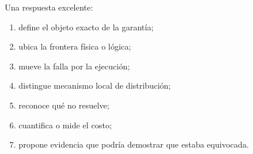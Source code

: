 \documentclass[variant=guiaresuelta,cover=institutional,mode=screen]{ua-engineering-v6-article}
\begin{document}
Una respuesta excelente:

\begin{enumerate}
\item define el objeto exacto de la garantía;
\item ubica la frontera física o lógica;
\item mueve la falla por la ejecución;
\item distingue mecanismo local de distribución;
\item reconoce qué no resuelve;
\item cuantifica o mide el costo;
\item propone evidencia que podría demostrar que estaba equivocada.
\end{enumerate}
\end{document}
